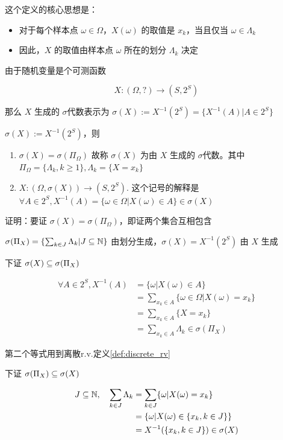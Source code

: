 这个定义的核心思想是：

\begin{itemize}
    \item 对于每个样本点 $\omega\in \Omega$，$X(\omega)$ 的取值是 $x_k$，当且仅当 $\omega\in \Lambda_k$
    \item 因此，$X$ 的取值由样本点 $\omega$ 所在的划分 $\Lambda_k$ 决定
\end{itemize}

由于随机变量是个可测函数 

\[
X:(\Omega, ?)\rightarrow (S,2^S)
\]

那么 $X$ 生成的 $\sigma$代数表示为 $\sigma(X):=X^{-1}(2^S)=\{X^{-1}(A)|A\in 2^S\}$

\begin{property}
$\sigma(X):=X^{-1}(2^S)$，则

\begin{enumerate}
    \item $\sigma(X)=\sigma(\Pi_{\Omega})$ 故称 $\sigma(X)$ 为由 $X$ 生成的 $\sigma$代数。其中 $\Pi_{\Omega}=\{\Lambda_k,k\geq 1\}, \Lambda_k=\{X=x_k\}$
    \item $X:(\Omega,\sigma(X))\rightarrow (S,2^S)$. 这个记号的解释是 $\forall A\in 2^S, X^{-1}(A)=\{\omega\in \Omega|X(\omega)\in A\}\in \sigma(X)$
\end{enumerate}
\end{property}

证明：要证 $\sigma(X)=\sigma(\Pi_{\Omega})$，即证两个集合互相包含

$\sigma(\Pi_X)=\{\sum_{k\in J}\Lambda_k|J\subseteq \mathbb{N}\}$ 由划分生成，$\sigma(X)=X^{-1}(2^S)$ 由 $X$ 生成

下证 $\sigma(X)\subseteq \sigma(\Pi_X)$

\[
\begin{aligned}
    \forall A\in 2^S, X^{-1}(A)&=\{\omega|X(\omega)\in A\}\\
    &=\sum_{x_k\in A}\{\omega\in \Omega|X(\omega)=x_k\}\\
    &=\sum_{x_k\in A}\{X=x_k\}\\
    &=\sum_{x_k\in A} \Lambda_k \in \sigma(\Pi_X)
\end{aligned}
\]

第二个等式用到离散r.v.定义\ref{def:discrete_rv}

下证 $\sigma(\Pi_X)\subseteq \sigma(X)$

\[
\begin{aligned}
    J\subseteq \mathbb{N}, \quad \sum_{k\in J}\Lambda_k&=\sum_{k\in J}\{\omega|X(\omega)=x_k\}\\
    &=\{\omega|X(\omega)\in \{x_k,k\in J\}\}\\
    &=X^{-1}(\{x_k,k\in J\})\in \sigma(X)
\end{aligned}
\]

